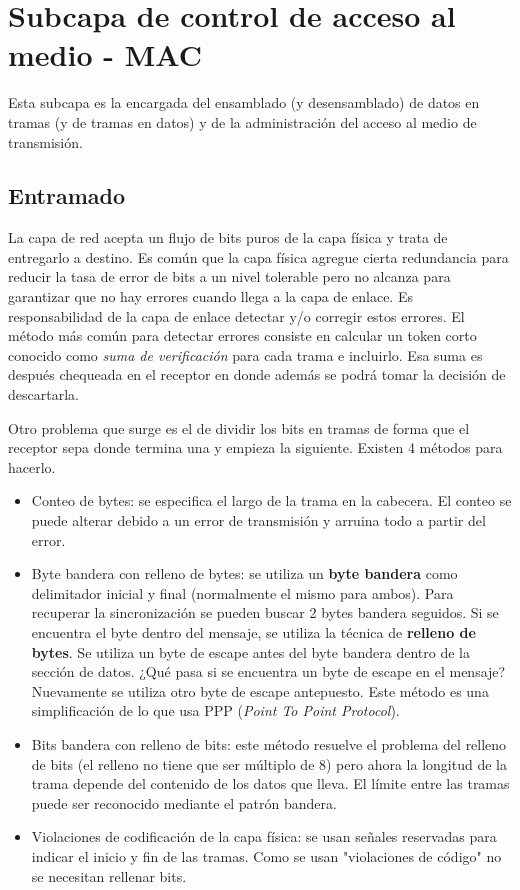 \documentclass{book}
\begin{document}
	\section{Subcapa de control de acceso al medio - MAC}
	Esta subcapa es la encargada del ensamblado (y desensamblado) de datos en tramas (y de tramas en datos) y de la administración del acceso al medio de transmisión.
	
	\subsection{Entramado}
	La capa de red acepta un flujo de bits puros de la capa física y trata de entregarlo a destino. Es común que la capa física agregue cierta redundancia para reducir la tasa de error de bits a un nivel tolerable pero no alcanza para garantizar que no hay errores cuando llega a la capa de enlace. Es responsabilidad de la capa de enlace detectar y/o corregir estos errores. El método más común para detectar errores consiste en calcular un token corto conocido como \textit{suma de verificación} para cada trama e incluirlo. Esa suma es después chequeada en el receptor en donde además se podrá tomar la decisión de descartarla.
	
	\pagebreak
	Otro problema que surge es el de dividir los bits en tramas de forma que el receptor sepa donde termina una y empieza la siguiente. Existen 4 métodos para hacerlo.
	
	\begin{itemize}
		\item Conteo de bytes: se especifica el largo de la trama en la cabecera. El conteo se puede alterar debido a un error de transmisión y arruina todo a partir del error.
		\item Byte bandera con relleno de bytes: se utiliza un \textbf{byte bandera} como delimitador inicial y final (normalmente el mismo para ambos). Para recuperar la sincronización se pueden buscar 2 bytes bandera seguidos. Si se encuentra el byte dentro del mensaje, se utiliza la técnica de \textbf{relleno de bytes}. Se utiliza un byte de escape antes del byte bandera dentro de la sección de datos. ¿Qué pasa si se encuentra un byte de escape en el mensaje? Nuevamente se utiliza otro byte de escape antepuesto. Este método es una simplificación de lo que usa PPP (\textit{Point To Point Protocol}).
		\item Bits bandera con relleno de bits: este método resuelve el problema del relleno de bits (el relleno no tiene que ser múltiplo de 8) pero ahora la longitud de la trama depende del contenido de los datos que lleva. El límite entre las tramas puede ser reconocido mediante el patrón bandera.
		\item Violaciones de codificación de la capa física: se usan señales reservadas para indicar el inicio y fin de las tramas. Como se usan "violaciones de código" no se necesitan rellenar bits.
	\end{itemize}
	
\end{document}
